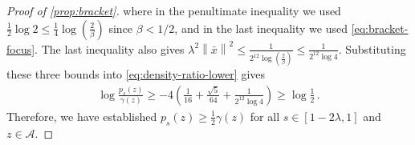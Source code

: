\documentclass[11pt]{article}
\newcommand{\1}{\mathbf 1}
\newcommand{\norm}[1]{\left\lVert #1\right\rVert}
\begin{document}
\begin{proof}[Proof of \cref{prop:bracket}]
    where in the penultimate inequality we used $
        \frac12\log2
        \leq \frac14\log\left(\frac{2}{\beta}\right)$ since $\beta<1/2$,
    and in the last inequality we used \eqref{eq:bracket-focus}.
    The last inequality also gives
    $\lambda^2\norm{\bar{x}}^2
        \leq
        \frac{1}{2^{12} \log\left(\frac{2}{\beta}\right)}
        \leq
        \frac{1}{2^{12} \log4}$.
    Substituting these three bounds into
    \eqref{eq:density-ratio-lower} gives
    \begin{align}
        \log\frac{p_s(z)}{\gamma(z)}
        \geq
        -4\left(\frac{1}{16}+\frac{\sqrt5}{64}+\frac{1}{2^{12} \log4}\right)
        \geq
        \log\frac12\,.
    \end{align}
    Therefore, we have established
    $p_s(z)
        \geq
        \frac12\gamma(z)$
    for all
    $s\in[1-2\lambda,1]$
    and
    $z\in\mathcal A$.


\end{proof}
\end{document}
